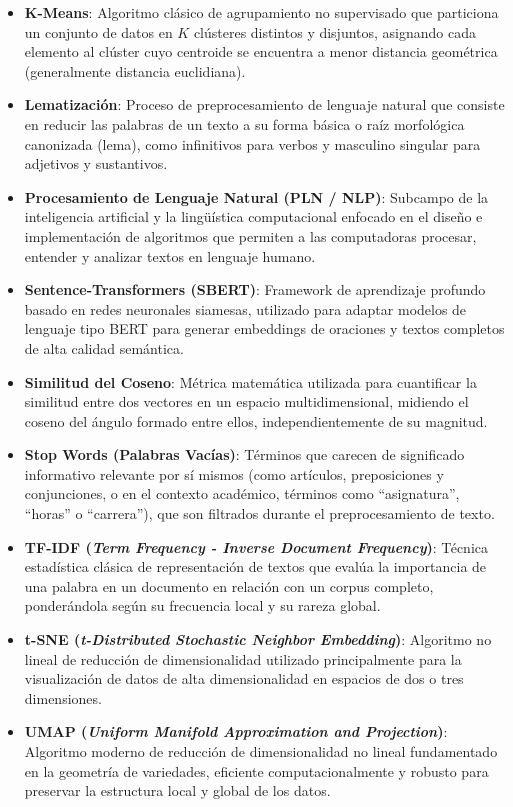 \begin{itemize}
    \item \textbf{K-Means}: Algoritmo clásico de agrupamiento no supervisado que particiona un conjunto de datos en $K$ clústeres distintos y disjuntos, asignando cada elemento al clúster cuyo centroide se encuentra a menor distancia geométrica (generalmente distancia euclidiana).
    
    \item \textbf{Lematización}: Proceso de preprocesamiento de lenguaje natural que consiste en reducir las palabras de un texto a su forma básica o raíz morfológica canonizada (lema), como infinitivos para verbos y masculino singular para adjetivos y sustantivos.
    
    \item \textbf{Procesamiento de Lenguaje Natural (PLN / NLP)}: Subcampo de la inteligencia artificial y la lingüística computacional enfocado en el diseño e implementación de algoritmos que permiten a las computadoras procesar, entender y analizar textos en lenguaje humano.
    
    \item \textbf{Sentence-Transformers (SBERT)}: Framework de aprendizaje profundo basado en redes neuronales siamesas, utilizado para adaptar modelos de lenguaje tipo BERT para generar embeddings de oraciones y textos completos de alta calidad semántica.
    
    \item \textbf{Similitud del Coseno}: Métrica matemática utilizada para cuantificar la similitud entre dos vectores en un espacio multidimensional, midiendo el coseno del ángulo formado entre ellos, independientemente de su magnitud.
    
    \item \textbf{Stop Words (Palabras Vacías)}: Términos que carecen de significado informativo relevante por sí mismos (como artículos, preposiciones y conjunciones, o en el contexto académico, términos como ``asignatura'', ``horas'' o ``carrera''), que son filtrados durante el preprocesamiento de texto.
    
    \item \textbf{TF-IDF (\textit{Term Frequency - Inverse Document Frequency})}: Técnica estadística clásica de representación de textos que evalúa la importancia de una palabra en un documento en relación con un corpus completo, ponderándola según su frecuencia local y su rareza global.
    
    \item \textbf{t-SNE (\textit{t-Distributed Stochastic Neighbor Embedding})}: Algoritmo no lineal de reducción de dimensionalidad utilizado principalmente para la visualización de datos de alta dimensionalidad en espacios de dos o tres dimensiones.
    
    \item \textbf{UMAP (\textit{Uniform Manifold Approximation and Projection})}: Algoritmo moderno de reducción de dimensionalidad no lineal fundamentado en la geometría de variedades, eficiente computacionalmente y robusto para preservar la estructura local y global de los datos.
\end{itemize}